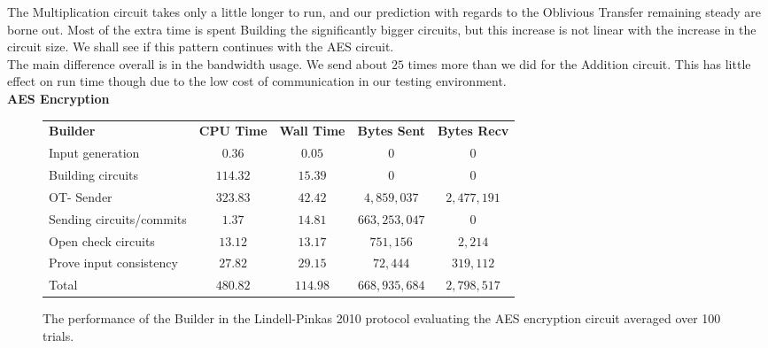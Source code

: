 \documentclass[ %
                    author={Nicholas Tutte},
                supervisor={Prof. Nigel Smart},
                    degree={MEng},
                     title={Secure Two Party Computation},
                  subtitle={A practical comparison of recent protocols},
                      type={Research - GG1K},
                      year={2015} ]{dissertation}
\begin{document}
				The Multiplication circuit takes only a little longer to run, and our prediction with regards to the Oblivious Transfer remaining steady are borne out. Most of the extra time is spent Building the significantly bigger circuits, but this increase is not linear with the increase in the circuit size. We shall see if this pattern continues with the AES circuit.\\

				The main difference overall is in the bandwidth usage. We send about $25$ times more than we did for the Addition circuit. This has little effect on run time though due to the low cost of communication in our testing environment.\\

				\FloatBarrier
				\noindent \textbf{AES Encryption}
				\begin{figure}[!ht]
					\begin{tabular}{| p{4.3cm} | c c c c |}
						\hline
						\textbf{Builder} & \textbf{CPU Time} & \textbf{Wall Time} & \textbf{Bytes Sent} & \textbf{Bytes Recv} \\
						\thickhline
						Input generation & $0.36$ & $0.05$ & $0$ & $0$ \\
						\hline
						Building circuits & $114.32$ & $15.39$ & $0$ & $0$ \\
						\hline
						OT- Sender & $323.83$ & $42.42$ & $4,859,037$ & $2,477,191$ \\
						\hline
						Sending circuits/commits & $1.37$ & $14.81$ & $663,253,047$ & $0$ \\
						\hline
						Open check circuits & $13.12$ & $13.17$ & $751,156$ & $2,214$ \\
						\hline
						Prove input consistency & $27.82$ & $29.15$ & $72,444$ & $319,112$ \\
						\thickhline
						Total & $480.82$ & $114.98$ & $668,935,684$ & $2,798,517$ \\
						\hline
					\end{tabular}
					\caption{The performance of the Builder in the Lindell-Pinkas 2010 protocol evaluating the AES encryption circuit averaged over 100 trials. \label{table:LP_2010_AES_Builder}}
				\end{figure}
\end{document}
